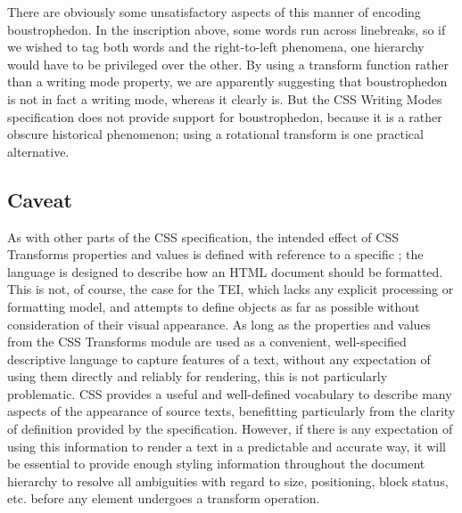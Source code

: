 There are obviously some unsatisfactory aspects of this manner of encoding boustrophedon. In the inscription above, some words run across linebreaks, so if we wished to tag both words and the right-to-left phenomena, one hierarchy would have to be privileged over the other. By using a transform function rather than a writing mode property, we are apparently suggesting that boustrophedon is not in fact a writing mode, whereas it clearly is. But the CSS Writing Modes specification does not provide support for boustrophedon, because it is a rather obscure historical phenomenon; using a rotational transform is one practical alternative. 
\subsection[{Caveat}]{Caveat}\label{WDCAV}\par
As with other parts of the CSS specification, the intended effect of CSS Transforms properties and values is defined with reference to a specific ; the language is designed to describe how an HTML document should be formatted. This is not, of course, the case for the TEI, which lacks any explicit processing or formatting model, and attempts to define objects as far as possible without consideration of their visual appearance. As long as the properties and values from the CSS Transforms module are used as a convenient, well-specified descriptive language to capture features of a text, without any expectation of using them directly and reliably for rendering, this is not particularly problematic. CSS provides a useful and well-defined vocabulary to describe many aspects of the appearance of source texts, benefitting particularly from the clarity of definition provided by the specification. However, if there is any expectation of using this information to render a text in a predictable and accurate way, it will be essential to provide enough styling information throughout the document hierarchy to resolve all ambiguities with regard to size, positioning, block status, etc. before any element undergoes a transform operation.

